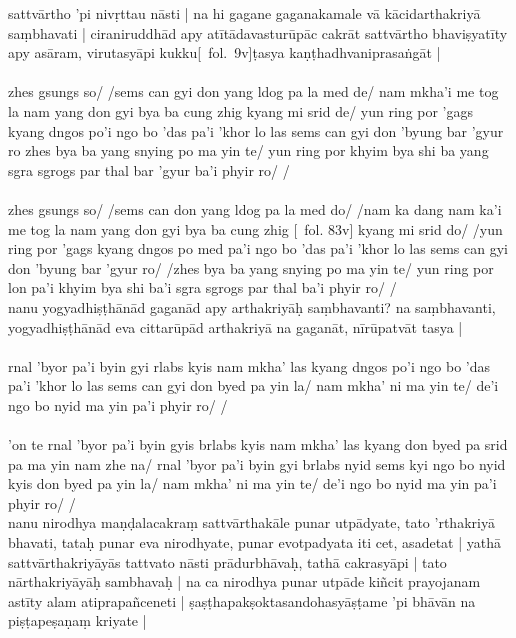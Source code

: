 \documentclass[12pt]{article}
\begin{document}
sattvārtho 'pi nivṛttau nāsti | na hi gagane gaganakamale vā kācidarthakriyā saṃbhavati | ciraniruddhād apy atītādavasturūpāc cakrāt sattvārtho bhaviṣyatīty apy asāram, virutasyāpi kukku[\MS\ fol.\ 9v]ṭasya kaṇṭhadhvaniprasaṅgāt |\\

\textbf{\TVA}\\
zhes gsungs so/ /sems can gyi don yang ldog pa la med de/ nam mkha'i me tog la nam yang don gyi bya ba cung zhig kyang mi srid de/ yun ring por 'gags kyang dngos po'i ngo bo 'das pa'i 'khor lo las sems can gyi don 'byung bar 'gyur ro zhes bya ba yang snying po ma yin te/ yun ring por khyim bya shi ba yang sgra sgrogs par thal bar 'gyur ba'i phyir ro/ /\\

\textbf{\TVB}\\
zhes gsungs so/ /sems can don yang ldog pa la med do/ /nam ka dang nam ka'i me tog la nam yang don gyi bya ba cung zhig [\TVB\ fol. 83v] kyang mi srid do/ /yun ring por 'gags kyang dngos po med pa'i ngo bo 'das pa'i 'khor lo las sems can gyi don 'byung bar 'gyur ro/ /zhes bya ba yang snying po ma yin te/ yun ring por lon pa'i khyim bya shi ba'i sgra sgrogs par thal ba'i phyir ro/ /\\

nanu yogyadhiṣṭhānād gaganād apy arthakriyāḥ saṃbhavanti? na saṃbhavanti, yogyadhiṣṭhānād eva cittarūpād arthakriyā na gaganāt, nīrūpatvāt tasya |\\

\textbf{\TVA}\\
rnal 'byor pa'i byin gyi rlabs kyis nam mkha' las kyang dngos po'i ngo bo 'das pa'i 'khor lo las sems can gyi don byed pa yin la/ nam mkha' ni ma yin te/ de'i ngo bo nyid ma yin pa'i phyir ro/ /\\

\textbf{\TVB}\\
'on te rnal 'byor pa'i byin gyis brlabs kyis nam mkha' las kyang don byed pa srid pa ma yin nam zhe na/ rnal 'byor pa'i byin gyi brlabs nyid sems kyi ngo bo nyid kyis don byed pa yin la/ nam mkha' ni ma yin te/ de'i ngo bo nyid ma yin pa'i phyir ro/ /\\

nanu nirodhya maṇḍalacakraṃ sattvārthakāle punar utpādyate, tato 'rthakriyā bhavati, tataḥ punar eva nirodhyate, punar evotpadyata iti cet, asadetat | yathā sattvārthakriyāyās tattvato nāsti prādurbhāvaḥ, tathā cakrasyāpi | tato nārthakriyāyāḥ sambhavaḥ | na ca nirodhya punar utpāde kiñcit prayojanam astīty alam atiprapañceneti | ṣaṣṭhapakṣoktasandohasyāṣṭame 'pi bhāvān na piṣṭapeṣaṇaṃ kriyate |\\
\end{document}
